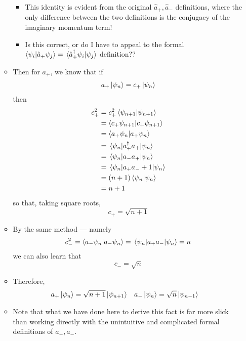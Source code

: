 \documentclass[../notes.tex]{subfiles}
\begin{document}
\begin{itemize}
\begin{itemize}
        \begin{itemize}
            \item This identity is evident from the original $\hat{a}_+,\hat{a}_-$ definitions, where the only difference between the two definitions is the conjugacy of the imaginary momentum term!
            \item Is this correct, or do I have to appeal to the formal $\braket{\psi_i}{\hat{a}_+\psi_j}=\braket*{\hat{a}_+^\dagger\psi_i}{\psi_j}$ definition??
        \end{itemize}
        \item Then for $a_+$, we know that if
        \begin{align*}
            a_+\ket{\psi_n} = c_+\ket{\psi_n}
        \end{align*}
        then
        \begin{align*}
            c_+^2 &= c_+^2\braket{\psi_{n+1}}\\
            &= \braket{c_+\psi_{n+1}}\\
            &= \braket{a_+\psi_n}\\
            &= \ev{a_+^\dagger a_+}{\psi_n}\\
            &= \ev{a_-a_+}{\psi_n}\\
            &= \ev{a_+a_-+1}{\psi_n}\\
            &= (n+1)\braket{\psi_n}\\
            &= n+1
        \end{align*}
        so that, taking square roots,
        \begin{equation*}
            c_+ = \sqrt{n+1}
        \end{equation*}
        \item By the same method --- namely
        \begin{equation*}
            c_-^2 = \braket{a_-\psi_n}
            = \ev{a_+a_-}{\psi_n}
            = n
        \end{equation*}
        we can also learn that
        \begin{equation*}
            c_- = \sqrt{n}
        \end{equation*}
        \item Therefore,
        \begin{align*}
            a_+\ket{\psi_n} &= \sqrt{n+1}\ket{\psi_{n+1}}&
            a_-\ket{\psi_n} &= \sqrt{n}\ket{\psi_{n-1}}
        \end{align*}
        \item Note that what we have done here to derive this fact is far more slick than working directly with the unintuitive and complicated formal definitions of $a_+,a_-$.

\end{itemize}
\end{itemize}
\end{document}
